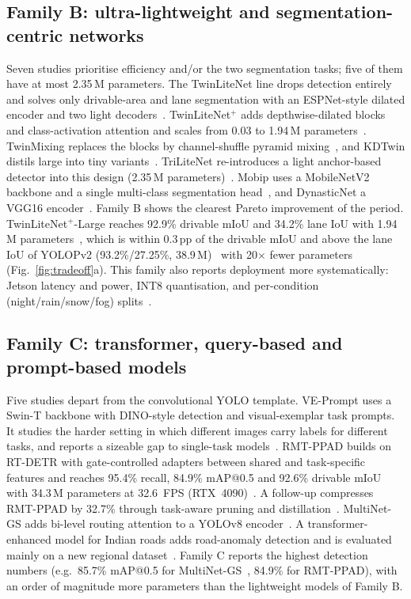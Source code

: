 \documentclass[journal,onecolumn]{IEEEtran}
\begin{document}
\subsection{Family B: ultra-lightweight and segmentation-centric networks}
Seven studies prioritise efficiency and/or the two segmentation tasks; five of them have at most 2.35\,M parameters. The TwinLiteNet line drops detection entirely and solves only drivable-area and lane segmentation with an ESPNet-style dilated encoder and two light decoders~\cite{che2023twinlitenet}. TwinLiteNet$^+$ adds depthwise-dilated blocks and class-activation attention and scales from 0.03 to 1.94\,M parameters~\cite{che2025twinliteplus}. TwinMixing replaces the blocks by channel-shuffle pyramid mixing~\cite{twinmixing2026}, and KDTwin distils large into tiny variants~\cite{kdtwin2026}. TriLiteNet re-introduces a light anchor-based detector into this design (2.35\,M parameters)~\cite{trilitenet2025}. Mobip uses a MobileNetV2 backbone and a single multi-class segmentation head~\cite{ye2023mobip}, and DynasticNet a VGG16 encoder~\cite{caldiran2022dynasticnet}. Family B shows the clearest Pareto improvement of the period. TwinLiteNet$^+$-Large reaches 92.9\% drivable mIoU and 34.2\% lane IoU with 1.94\,M parameters~\cite{che2025twinliteplus}, which is within 0.3\,pp of the drivable mIoU and above the lane IoU of YOLOPv2 (93.2\%/27.25\%, 38.9\,M)~\cite{han2022yolopv2} with 20$\times$ fewer parameters (Fig.~\ref{fig:tradeoff}a). This family also reports deployment more systematically: Jetson latency and power, INT8 quantisation, and per-condition (night/rain/snow/fog) splits~\cite{che2025twinliteplus,trilitenet2025,twinmixing2026}.

\subsection{Family C: transformer, query-based and prompt-based models}
Five studies depart from the convolutional YOLO template. VE-Prompt uses a Swin-T backbone with DINO-style detection and visual-exemplar task prompts. It studies the harder setting in which different images carry labels for different tasks, and reports a sizeable gap to single-task models~\cite{liang2023veprompt}. RMT-PPAD builds on RT-DETR with gate-controlled adapters between shared and task-specific features and reaches 95.4\% recall, 84.9\% mAP@0.5 and 92.6\% drivable mIoU with 34.3\,M parameters at 32.6~FPS (RTX~4090)~\cite{wang2026rmtppad}. A follow-up compresses RMT-PPAD by 32.7\% through task-aware pruning and distillation~\cite{compress2025}. MultiNet-GS adds bi-level routing attention to a YOLOv8 encoder~\cite{li2023multinetgs}. A transformer-enhanced model for Indian roads adds road-anomaly detection and is evaluated mainly on a new regional dataset~\cite{selvarajan2026safety}. Family C reports the highest detection numbers (e.g.\ 85.7\% mAP@0.5 for MultiNet-GS~\cite{li2023multinetgs}, 84.9\% for RMT-PPAD), with an order of magnitude more parameters than the lightweight models of Family B.
\end{document}
